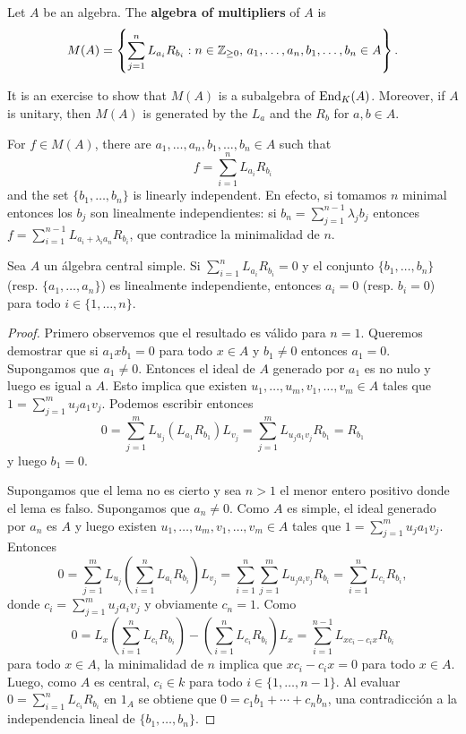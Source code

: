 \begin{definition}
	Let $A$ be an algebra. The \textbf{algebra of multipliers} of $A$ 
	is 
	\[
		M(A)=\left\{\sum_{j=1}^n L_{a_i}R_{b_i}:n\in\mathbb{Z}_{\geq0},\,a_1,\dots,a_n,b_1,\dots,b_n\in A\right\}.
	\]
\end{definition}

It is an exercise to show that $M(A)$ is a subalgebra of $\operatorname{End}_K(A)$. Moreover,
if $A$ is unitary, then $M(A)$ is generated by the $L_a$ and the $R_b$ for 
$a,b\in A$.

\begin{remark}
	\label{rem:SkolemNoether}
	For $f\in M(A)$,
	there are $a_1,\dots,a_n,b_1,\dots,b_n\in A$ such that 
	\[
		f=\sum_{i=1}^n L_{a_i}R_{b_i}
	\]
	and the set $\{b_1,\dots,b_n\}$ is linearly independent. En efecto,
	si tomamos $n$ minimal entonces los $b_j$ son linealmente independientes:
	si $b_n=\sum_{j=1}^{n-1}\lambda_jb_j$ entonces
	$f=\sum_{i=1}^{n-1}L_{a_i+\lambda_ia_n}R_{b_i}$, que contradice la
	minimalidad de $n$.
\end{remark}

\begin{lemma}
	\label{lem:SkolemNoether1}
	Sea $A$ un álgebra central simple. Si $\sum_{i=1}^n L_{a_i}R_{b_i}=0$ y el
	conjunto $\{b_1,\dots,b_n\}$ (resp. $\{a_1,\dots,a_n\}$) es linealmente
	independiente, entonces $a_i=0$ (resp. $b_i=0$) para todo
	$i\in\{1,\dots,n\}$.
\end{lemma}

\begin{proof}
	Primero observemos que el resultado es válido para $n=1$. Queremos
	demostrar que si $a_1xb_1=0$ para todo $x\in A$ y $b_1\ne0$ entonces
	$a_1=0$. Supongamos que $a_1\ne 0$. Entonces el ideal de $A$ generado por
	$a_1$ es no nulo y luego es igual a $A$. Esto implica que existen
	$u_1,\dots,u_m,v_1,\dots,v_m\in A$ tales que $1=\sum_{j=1}^m u_ja_1v_j$.
	Podemos escribir entonces 
	\[
		0=\sum_{j=1}^m L_{u_j}(L_{a_1}R_{b_1})L_{v_j}=\sum_{j=1}^m L_{u_ja_1v_j}R_{b_1}=R_{b_1}
	\]
	y luego $b_1=0$. 

	Supongamos que el lema no es cierto y sea $n>1$ el menor entero positivo
	donde el lema es falso. Supongamos que $a_n\ne 0$. Como $A$ es simple, el
	ideal generado por $a_n$ es $A$ y luego existen
	$u_1,\dots,u_m,v_1,\dots,v_m\in A$ tales que $1=\sum_{j=1}^m u_ja_1v_j$.
	Entonces
	\[
		0=\sum_{j=1}^m L_{u_j}\left(\sum_{i=1}^n L_{a_i}R_{b_i}\right)L_{v_j}=\sum_{i=1}^n\sum_{j=1}^m L_{u_ja_iv_j}R_{b_i}=\sum_{i=1}^n L_{c_i}R_{b_i},
	\]
	donde $c_i=\sum_{j=1}^m u_ja_iv_j$ y obviamente $c_n=1$. Como 
	\[
		0=L_x\left(\sum_{i=1}^n L_{c_i}R_{b_i}\right)-\left(\sum_{i=1}^n L_{c_i}R_{b_i}\right)L_x=\sum_{i=1}^{n-1}L_{xc_i-c_ix}R_{b_i}
	\]
	para todo $x\in A$, la minimalidad de $n$ implica que $xc_i-c_ix=0$ para
	todo $x\in A$. Luego, como $A$ es central, $c_i\in k$ para todo
	$i\in\{1,\dots,n-1\}$. Al evaluar $0=\sum_{i=1}^n L_{c_i}R_{b_i}$ en $1_A$
	se obtiene que $0=c_1b_1+\cdots+c_nb_n$, una contradicción a la
	independencia lineal de $\{b_1,\dots,b_n\}$. 
\end{proof}

